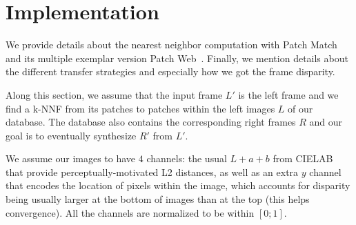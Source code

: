 
\section{Implementation}

We provide details about the nearest neighbor computation with Patch Match~\cite{Barnes09} and its multiple exemplar version Patch Web~\cite{Barnes11}.
Finally, we mention details about the different transfer strategies and especially how we got the frame disparity.

Along this section, we assume that the input frame $L'$ is the left frame and we find a k-NNF from its patches to patches within the left images $L$ of our database.
The database also contains the corresponding right frames $R$ and our goal is to eventually synthesize $R'$ from $L'$.

We assume our images to have $4$ channels: the usual $L+a+b$ from CIELAB that provide perceptually-motivated L2 distances, as well as an extra $y$ channel that encodes the location of pixels within the image, which accounts for disparity being usually larger at the bottom of images than at the top (this helps convergence).
All the channels are normalized to be within $[0;1]$.



